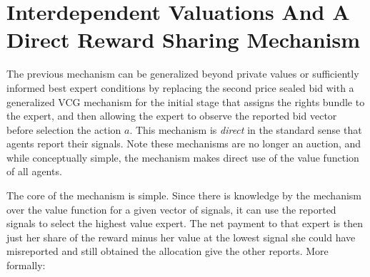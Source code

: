 \section{Interdependent Valuations And A Direct Reward Sharing Mechanism}

The previous mechanism can be generalized beyond private values or sufficiently informed best expert conditions by replacing the second price sealed bid with a  generalized VCG mechanism \citep{maskin1992auctions} for the initial stage that assigns the rights bundle to the expert, and then allowing the expert to observe the reported bid vector before selection the action $a$. This mechanism is \emph{direct} in the standard sense that agents report their signals. Note these mechanisms are no longer an auction, and while conceptually simple, the mechanism makes direct use of the value function of all agents.

The core of the mechanism is simple. Since there is knowledge by the mechanism over the value function for a given vector of signals, it can use the reported signals to select the highest value expert. The net payment to that expert is then just her share of the reward minus her value at the lowest signal she could have misreported and still obtained the allocation give the other reports. More formally:

